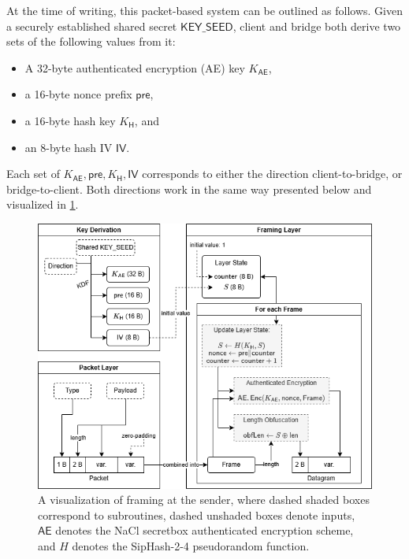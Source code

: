 At the time of writing, this packet-based system can be outlined as follows. Given a securely established shared secret $\mathsf{KEY\_SEED}$, client and bridge both derive two sets of the following values from it:
\begin{itemize}
    \item A 32-byte authenticated encryption (AE) key $K_\mathsf{AE}$,
    \item a 16-byte nonce prefix $\mathsf{pre}$,
    \item a 16-byte hash key $K_\mathsf{H}$, and
    \item an 8-byte hash IV $\mathsf{IV}$.
\end{itemize}

Each set of $K_\mathsf{AE}, \mathsf{pre}, K_\mathsf{H}, \mathsf{IV}$ corresponds to either the direction client-to-bridge, or bridge-to-client. Both directions work in the same way presented below and visualized in \cref{fig:framing}.

\begin{figure}
    \centering
    \includegraphics[width=\linewidth]{images/packet-framing.png}
    \caption[
        A visualization of \obfsfour{} framing at the sender.
    ]{
        A visualization of \obfsfour{} framing at the sender, where dashed shaded boxes correspond to subroutines, dashed unshaded boxes denote inputs, $\mathsf{AE}$ denotes the NaCl secretbox authenticated encryption scheme, and $H$ denotes the SipHash-2-4 pseudorandom function. 
    }
    \label{fig:framing}
\end{figure}

